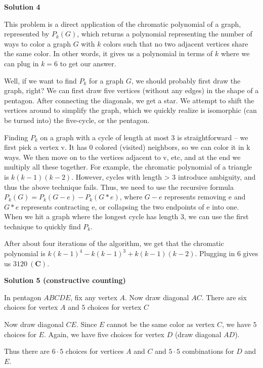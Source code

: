 \begin{enumerate}
 



\textbf{Solution 4}

This problem is a direct application of the chromatic polynomial of a graph, represented by $P_k(G)$, which returns a polynomial representing the number of ways to color a graph $G$ with $k$ colors such that no two adjacent vertices share the same color. In other words, it gives us a polynomial in terms of $k$ where we can plug in $k=6$ to get our answer.   

 Well, if we want to find $P_k$ for a graph $G$, we should probably first draw the graph, right? We can first draw five vertices (without any edges) in the shape of a pentagon. After connecting the diagonals, we get a star. We attempt to shift the vertices around to simplify the graph, which we quickly realize is isomorphic (can be turned into) the five-cycle, or the pentagon.   

 Finding $P_k$ on a graph with a cycle of length at most 3 is straightforward -- we first pick a vertex v. It has 0 colored (visited) neighbors, so we can color it in k ways. We then move on to the vertices adjacent to v, etc, and at the end we multiply all these together. For example, the chromatic polynomial of a triangle is $k(k-1)(k-2)$. However, cycles with length > 3 introduce ambiguity, and thus the above technique fails. Thus, we need to use the recursive formula $P_k(G) = P_k(G-e)-P_k(G*e)$, where $G-e$ represents removing e and $G*e$ represents contracting e, or collapsing the two endpoints of e into one. When we hit a graph where the longest cycle has length 3, we can use the first technique to quickly find $P_k$. 

 After about four iterations of the algorithm, we get that the chromatic polynomial is $k(k-1)^4 - k(k-1)^3 + k(k-1)(k-2)$. Plugging in 6 gives us $\boxed{3120 \ \mathbf{(C)}}$. 

 



\textbf{Solution 5 (constructive counting)}

In pentagon $ABCDE$, fix any vertex $A$. Now draw diagonal $AC$. There are six choices for vertex $A$ and $5$ choices for vertex $C$

 Now draw diagonal $CE$. Since $E$ cannot be the same color as vertex $C$, we have $5$ choices for $E$. Again, we have five choices for vertex $D$ (draw diagonal $AD$).

 Thus there are $6 \cdot 5$ choices for vertices $A$ and $C$ and $5 \cdot 5$ combinations for $D$ and $E$. 


\end{enumerate}
